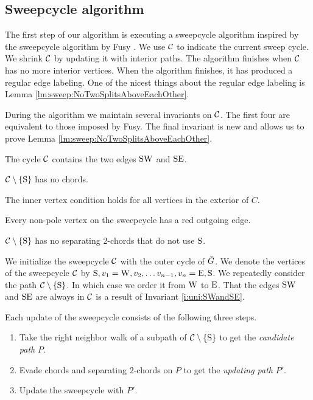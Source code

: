 
\subsection{Sweepcycle algorithm}
\thispagestyle{plain}
\label{ss:sweep}
The first step of our algorithm is executing a sweepcycle algorithm inspired by the sweepcycle algorithm by Fusy \cite{Fusy2006}. We use $\mathcal{C}$ to indicate the current sweep cycle. We shrink $\mathcal{C}$ by updating it with interior paths.
The algorithm finishes when $\mathcal{C}$ has no more interior vertices. When the algorithm finishes, it has produced a regular edge labeling.
One of the nicest things about the regular edge labeling is Lemma \ref{lm:sweep:NoTwoSplitsAboveEachOther}.

During the algorithm we maintain several invariants on $\mathcal{C}$. The first four are equivalent to those imposed by Fusy. The final invariant is new and allows us to prove Lemma \ref{lm:sweep:NoTwoSplitsAboveEachOther}.

\begin{invariants}
  \itemsep=-4pt
  \item \label{i:uni:SWandSE} The cycle $\mathcal{C}$ contains the two edges $\mathrm{S} \mathrm{W}$ and $\mathrm{S} \mathrm{E}$.
  \item \label{i:uni:noChords} $\mathcal{C} \setminus \left\lbrace {\mathrm{S}} \right\rbrace$ has no chords.
  \item \label{i:uni:intVertCond} The inner vertex condition holds for all vertices in the exterior of $C$.
  \item \label{i:uni:redOutgoing} Every non-pole vertex on the sweepcycle has a red outgoing edge.
  \item \label{i:uni:no2Chords} $\mathcal{C}\setminus \left\lbrace {\mathrm{S}} \right\rbrace$ has no separating 2-chords that do not use $\mathrm{S}$.
\end{invariants}

We initialize the sweepcycle $\mathcal{C}$ with the outer cycle of $\bar{G}$.
We denote the vertices of the sweepcycle $\mathcal{C}$ by $\mathrm{S}, v_1 = \mathrm{W}, v_2, \ldots v_{n-1}, v_n = \mathrm{E}, \mathrm{S}$.
We repeatedly consider the path $\mathcal{C} \setminus \left\lbrace {\mathrm{S}} \right\rbrace$.
In which case we order it from $\mathrm{W}$ to $\mathrm{E}$. That the edges $\mathrm{S} \mathrm{W}$ and $\mathrm{S} \mathrm{E}$ are always in $\mathcal{C}$ is a result of Invariant \ref{i:uni:SWandSE}.


Each update of the sweepcycle consists of the following three steps.
\begin{enumerate}
  \itemsep=-4pt
  \item Take the right neighbor walk of a subpath of $\mathcal{C} \setminus \left\lbrace {\mathrm{S}} \right\rbrace$ to get the \emph{candidate path} $P$.
  \item Evade chords and separating $2$-chords on $P$ to get the \emph{updating path} $P'$.
  \item Update the sweepcycle with $P'$.
\end{enumerate}

